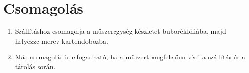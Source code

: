 \chapter{Csomagolás}\label{ch:package}

\begin{enumerate}
    \item Szállításhoz csomagolja a műszeregység készletet buborékfóliába, majd helyezze merev kartondobozba.
    \item Más csomagolás is elfogadható, ha a műszert megfelelően védi a szállítás és a tárolás során.
\end{enumerate}
